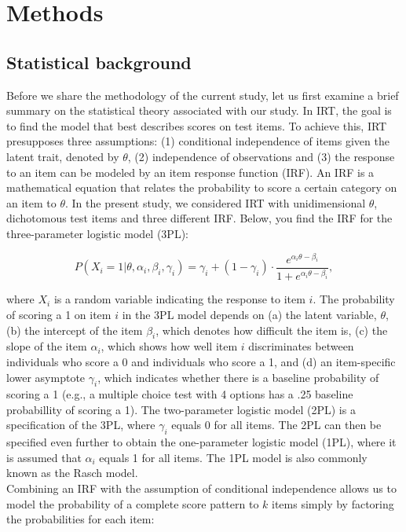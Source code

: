 \documentclass[Royal,sageapa,times,doublespace]{sagej}
\begin{document}
\section{Methods}
\subsection{Statistical background}
Before we share the methodology of the current study, let us first examine a brief summary on the statistical theory associated with our study. In IRT, the goal is to find the model that best describes scores on test items. To achieve this, IRT presupposes three assumptions: (1) conditional independence of items given the latent trait, denoted by $\theta$, (2) independence of observations and (3) the response to an item can be modeled by an item response function (IRF). An IRF is a mathematical equation that relates the probability to score a certain category on an item to $\theta$. In the present study, we considered IRT with unidimensional $\theta$, dichotomous test items and three different IRF. Below, you find the IRF for the three-parameter logistic model (3PL):

\begin{equation}
P(X_i = 1 | \theta, \alpha_{i}, \beta_{i}, \gamma_{i}) = \gamma_{i} + (1 - \gamma_{i}) \cdot 
\frac{e^{\alpha_{i}\theta - \beta_{i}}}{1 + e^{\alpha_{i}\theta - \beta_{i}}},
\end{equation}

where $X_i$ is a random variable indicating the response to item $i$. The probability of scoring a 1 on item $i$ in the 3PL model depends on (a) the latent variable, $\theta$, (b) the intercept of the item $\beta_{i}$, which denotes how difficult the item is, (c) the slope of the item $\alpha_{i}$, which shows how well item $i$ discriminates between individuals who score a 0 and individuals who score a 1, and (d) an item-specific lower asymptote $\gamma_{i}$, which indicates whether there is a baseline probability of scoring a 1 (e.g., a multiple choice test with 4 options has a .25 baseline probabillity of scoring a 1). The two-parameter logistic model (2PL) is a specification of the 3PL, where $\gamma_{i}$ equals 0 for all items. The 2PL can then be specified even further to obtain the one-parameter logistic model (1PL), where it is assumed that $\alpha_{i}$ equals 1 for all items. The 1PL model is also commonly known as the Rasch model. \\
\indent Combining an IRF with the assumption of conditional independence allows us to model the probability of a complete score pattern to $k$ items simply by factoring the probabilities for each item:
\end{document}
